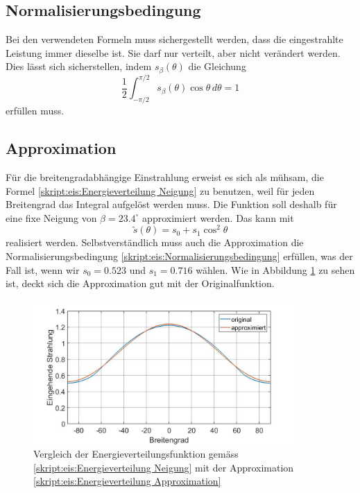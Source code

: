 \begin{refsection}
\subsection{Normalisierungsbedingung} \label{skript:eis:Modellverbesserung:Normalisierung}
Bei den verwendeten Formeln muss sichergestellt werden, dass die eingestrahlte Leistung immer dieselbe ist. Sie darf nur verteilt, aber nicht verändert werden. Dies lässt sich sicherstellen, indem $s_\beta(\theta)$ die Gleichung
\begin{equation}\label{skript:eis:Normalisierungsbedingung}
	\frac{1}{2}\int_{-\pi/2}^{\pi/2}s_{\beta}(\theta)\cos\theta\,d\theta
	=
	1
\end{equation}
erfüllen muss.
\subsection{Approximation}
Für die breitengradabhängige Einstrahlung erweist es sich als mühsam, die Formel \eqref{skript:eis:Energieverteilung Neigung} zu benutzen, weil für jeden Breitengrad das Integral aufgelöst werden muss. Die Funktion soll deshalb für eine fixe Neigung von $\beta=23.4^{\circ}$ approximiert werden. Das kann mit
\begin{equation}\label{skript:eis:Energieverteilung Approximation}
	\tilde{s}(\theta)
	=
	s_0+s_1\cos^{2}\theta
\end{equation}
realisiert werden.
Selbstverständlich muss auch die Approximation die Normalisierungsbedingung \eqref{skript:eis:Normalisierungsbedingung} erfüllen, was der Fall ist, wenn wir $s_0=0.523$ und $s_1=0.716$ wählen.
Wie in Abbildung \ref{skript:eis:fig:Einstrahlung_approximiert_Vergleich} zu sehen ist, deckt sich die Approximation gut mit der Originalfunktion.
\begin{figure}
	\centering
	\includegraphics[width=10cm]{eis/Einstrahlung_approximiert_Vergleich.jpg}
	\caption{Vergleich der Energieverteilungsfunktion gemäss \eqref{skript:eis:Energieverteilung Neigung} mit der Approximation \eqref{skript:eis:Energieverteilung Approximation}}
	\label{skript:eis:fig:Einstrahlung_approximiert_Vergleich}
\end{figure}

\end{refsection}
